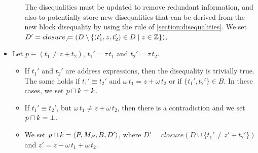 \begin{itemize}
\begin{itemize}
          The disequalities must be updated to remove redundant information, and also to
          potentially store new disequalities that can be derived from the new block disequality by using the rule
           of \cref{section:disequalities}.
        We set $D' = closure_\neq(D \setminus \{(t_1',z,t_2') \in D \mid z \in \mathbb{Z}\})$.
    \end{itemize}
    \item Let $p \equiv (t_1 \neq z + t_2)$, $t_1'=\tau\,t_1$ and $t_2'=\tau\,t_2$.
    \begin{itemize}
        \item If $t_1'$ and $t_2'$ are address expressions, then the disequality is trivially true.
        The same holds if $t_1' \equiv t_2'$ and $\omega\,t_1 = z + \omega\,t_2$
        or if $\{t_1',t_2'\}\in B$. In these cases, we set $p \sqcap k = k$.
         \item If $t_1' \equiv t_2'$, but $\omega\,t_1 \neq z + \omega\,t_2$, then
         there is a contradiction and we set $p \sqcap k = \bot$.
         \item We set $p \sqcap k = \langle P,M_P,B,D'\rangle$, where $D' = closure(D \cup \{t_1' \neq z' + t_2'\})$
         and $z' = z - \omega\,t_1 + \omega\,t_2$.
    \end{itemize}
\end{itemize}

